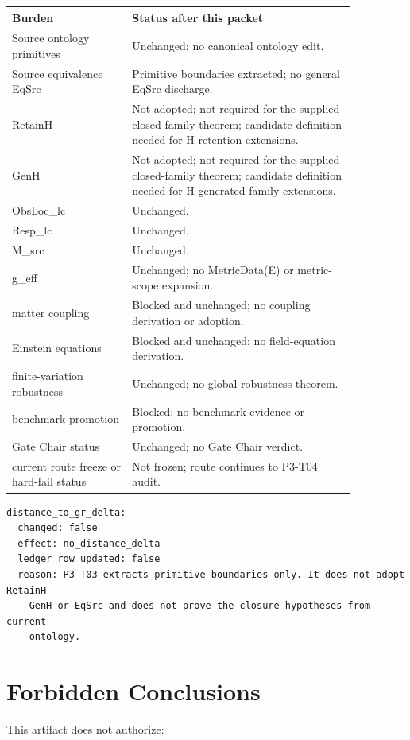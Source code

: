 \documentclass[11pt]{article}
\begin{document}
\begin{longtable}{p{0.30\linewidth}p{0.56\linewidth}}
\toprule
Burden & Status after this packet \\
\midrule
Source ontology primitives & Unchanged; no canonical ontology edit. \\
Source equivalence EqSrc & Primitive boundaries extracted; no general EqSrc discharge. \\
RetainH & Not adopted; not required for the supplied closed-family theorem; candidate definition needed for H-retention extensions. \\
GenH & Not adopted; not required for the supplied closed-family theorem; candidate definition needed for H-generated family extensions. \\
ObsLoc\_lc & Unchanged. \\
Resp\_lc & Unchanged. \\
M\_src & Unchanged. \\
g\_eff & Unchanged; no MetricData(E) or metric-scope expansion. \\
matter coupling & Blocked and unchanged; no coupling derivation or adoption. \\
Einstein equations & Blocked and unchanged; no field-equation derivation. \\
finite-variation robustness & Unchanged; no global robustness theorem. \\
benchmark promotion & Blocked; no benchmark evidence or promotion. \\
Gate Chair status & Unchanged; no Gate Chair verdict. \\
current route freeze or hard-fail status & Not frozen; route continues to P3-T04 audit. \\
\bottomrule
\end{longtable}

\begin{verbatim}
distance_to_gr_delta:
  changed: false
  effect: no_distance_delta
  ledger_row_updated: false
  reason: P3-T03 extracts primitive boundaries only. It does not adopt RetainH
    GenH or EqSrc and does not prove the closure hypotheses from current
    ontology.
\end{verbatim}

\section{Forbidden Conclusions}

This artifact does not authorize:
\end{document}
